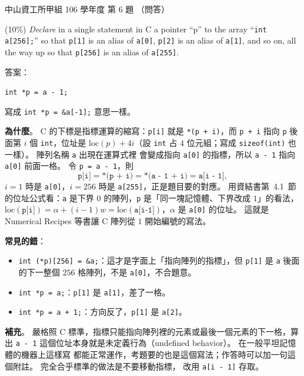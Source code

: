 \begin{pastexam}[label={px:nsysu-106-osds-01}]{中山資工所甲組 106 學年度 第 6 題}
（問答）

(10\%) \textit{Declare} in a single statement in C a pointer ``p'' to the array
``\texttt{int a[256];}'' so that \texttt{p[1]} is an alias of \texttt{a[0]}, \texttt{p[2]} is an
alias of \texttt{a[1]}, and so on, all the way up so that \texttt{p[256]} is an alias of
\texttt{a[255]}.
\end{pastexam}

\begin{pastsoln}
答案：
\begin{center}
\texttt{int *p = a - 1;}
\end{center}
寫成 \texttt{int *p = \&a[-1];} 意思一樣。

\textbf{為什麼}。 C 的下標是指標運算的縮寫：\texttt{p[i]} 就是 \texttt{*(p + i)}，而
\texttt{p + i} 指向 \texttt{p} 後面第 $i$ 個 \texttt{int}，位址是 $\mathrm{loc}(p) + 4i$（設
\texttt{int} 占 $4$ 位元組；寫成 \texttt{sizeof(int)} 也一樣）。 陣列名稱 \texttt{a} 出現在運算式裡
會變成指向 \texttt{a[0]} 的指標，所以 \texttt{a - 1} 指向 \texttt{a[0]} 前面一格。 令
\texttt{p = a - 1}，則
\[
\texttt{p[i]} = \texttt{*(p + i)} = \texttt{*(a - 1 + i)} = \texttt{a[i - 1]},
\]
$i = 1$ 時是 \texttt{a[0]}，$i = 256$ 時是 \texttt{a[255]}，正是題目要的對應。 用資結書第~4.1~節
的位址公式看：\texttt{a} 是下界 $0$ 的陣列，\texttt{p} 是「同一塊記憶體、下界改成 $1$」的看法，
$\mathrm{loc}(\texttt{p[i]}) = \alpha + (i - 1)w = \mathrm{loc}(\texttt{a[i-1]})$，$\alpha$ 是
\texttt{a[0]} 的位址。 這就是 Numerical Recipes 等書讓 C 陣列從 $1$ 開始編號的寫法。

\textbf{常見的錯}：
\begin{itemize}
\item \texttt{int (*p)[256] = \&a;}：這才是字面上「指向陣列的指標」，但 \texttt{p[1]} 是
\texttt{a} 後面的下一整個 $256$ 格陣列，不是 \texttt{a[0]}，不合題意。
\item \texttt{int *p = a;}：\texttt{p[1]} 是 \texttt{a[1]}，差了一格。
\item \texttt{int *p = a + 1;}：方向反了，\texttt{p[1]} 是 \texttt{a[2]}。
\end{itemize}

\textbf{補充}。 嚴格照 C 標準，指標只能指向陣列裡的元素或最後一個元素的下一格，算出
\texttt{a - 1} 這個位址本身就是未定義行為（undefined behavior）。 在一般平坦記憶體的機器上這樣寫
都能正常運作，考題要的也是這個寫法；作答時可以加一句這個附註。 完全合乎標準的做法是不要移動指標，
改用 \texttt{a[i - 1]} 存取。
\end{pastsoln}
